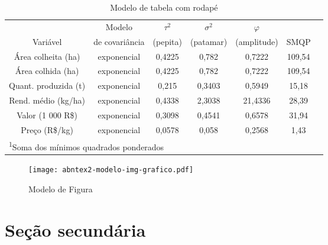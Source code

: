 \documentclass[
	12pt,				%
	openright,			%
	oneside,			%
	a4paper,			%
	english,			%
	french,				%
	spanish,			%
	brazil				%
	]{abntex2}
\begin{document}
\begin{table}[htb]
	\centering
	\caption{Modelo de tabela com rodapé}
	\label{my-label}
	\begin{tabular}{ccccccc}  %
		\hline
		& Modelo  & $\tau^2$  & $\sigma^2$  & $\varphi$  &   \\
		Variável             &  de covariância &  (pepita) &  (patamar) &  (amplitude) &  SMQP \footnotemark[1] \\
		\hline
		Área colheita (ha)   & exponencial           & 0,4225   & 0,782     & 0,7222      & 109,54 \\
		Área colhida (ha)    & exponencial           & 0,4225   & 0,782     & 0,7222      & 109,54 \\
		Quant. produzida (t) & exponencial           & 0,215    & 0,3403    & 0,5949      & 15,18  \\
		Rend. médio (kg/ha)  & exponencial           & 0,4338   & 2,3038    & 21,4336     & 28,39  \\
		Valor (1 000 R\$)    & exponencial           & 0,3098   & 0,4541    & 0,6578      & 31,94  \\
		Preço (R\$/kg)       & exponencial           & 0,0578   & 0,058     & 0,2568      & 1,43   \\
		\hline
		\multicolumn{6}{l}{\textsuperscript{1}\footnotesize{Soma dos mínimos quadrados ponderados }}
		
	\end{tabular}
	
\end{table}

\lipsum[10-12]

\begin{figure}[htb]
	\caption{\label{fig_grafico} Modelo de Figura}
	\begin{center}
		\texttt{[image: abntex2-modelo-img-grafico.pdf]}
	\end{center}
\end{figure}

\section{Seção secundária}

\lipsum[13]
\end{document}
